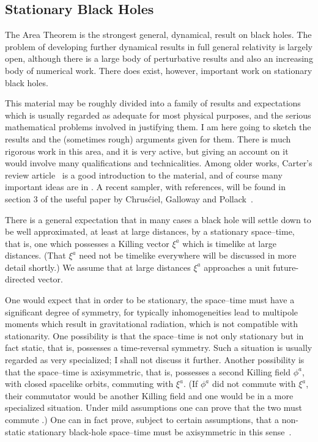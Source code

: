 \documentclass[12pt]{article}
\begin{document}
\subsection{Stationary Black Holes}

The Area Theorem is the strongest general, dynamical, result on black holes.  
The problem of developing further dynamical results in full general relativity is largely open, although there is a large body of perturbative results and also an increasing body of numerical work.
There does exist, however, important work on stationary black holes.

This material may be roughly divided into a family of results and expectations which is usually regarded as adequate for most physical purposes, and the serious mathematical problems involved in justifying them.  
I am here going to sketch the results and the (sometimes rough) arguments given for them.  There is much rigorous work in this area, and it is very active, but giving an account on it
would involve many qualifications and technicalities.
Among older works,
Carter's review article~\citep{Carter:1979} is a good introduction to the material, and of course many important ideas are in \citet{Hawking:1973uf}.  
A recent sampler, with references, will be found in section 3 of the useful paper by Chrus\'ciel, Galloway and Pollack~\cite{Chrusciel:2010fn}.


There is a general expectation that in many cases a black hole will settle down to be well approximated, at least at large distances, by a stationary space--time, that is, one which possesses a Killing vector $\xi ^a$ which is timelike at large distances.   
(That $\xi ^a$ need not be timelike everywhere will be discussed in more detail shortly.)
We assume that at large distances $\xi ^a$ approaches a unit future-directed vector.


One would expect that in order to be stationary, the space--time must have a significant degree of symmetry, for typically inhomogeneities lead to multipole moments which result in gravitational radiation, which is not compatible with stationarity.  One possibility is that the space--time is not only stationary but in fact static, that is, possesses a time-reversal symmetry.  Such a situation is usually regarded as very specialized; I shall not discuss it further.  Another possibility is that the space--time is axisymmetric, that is, possesses a second Killing field $\phi ^a$, with closed spacelike orbits, commuting with $\xi ^a$.  (If $\phi ^a$ did not commute with $\xi ^a$, their commutator would be another Killing field and one would be in a more specialized situation.  Under mild assumptions one can prove that the two must commute \citep{Carter:1970ea,Carter:1979}.)  One can in fact prove, subject to certain assumptions, that a non-static stationary black-hole space--time must be axisymmetric in this sense~\citep{Hawking:1973uf,Chrusciel:2010fn}.
\end{document}

